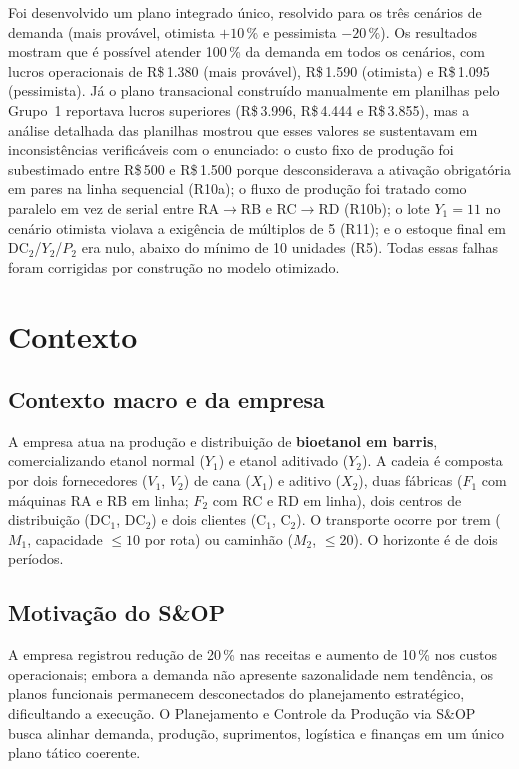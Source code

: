 \documentclass[11pt,a4paper]{article}
\newcommand{\rs}{R\$\,}
\begin{document}
Foi desenvolvido um plano integrado único, resolvido para os três cenários de demanda (mais provável, otimista $+10\,\%$ e pessimista $-20\,\%$). Os resultados mostram que é possível atender 100\,\% da demanda em todos os cenários, com lucros operacionais de \rs1.380 (mais provável), \rs1.590 (otimista) e \rs1.095 (pessimista). Já o plano transacional construído manualmente em planilhas pelo Grupo~1 reportava lucros superiores (\rs3.996, \rs4.444 e \rs3.855), mas a análise detalhada das planilhas mostrou que esses valores se sustentavam em inconsistências verificáveis com o enunciado: o custo fixo de produção foi subestimado entre \rs500 e \rs1.500 porque desconsiderava a ativação obrigatória em pares na linha sequencial (R10a); o fluxo de produção foi tratado como paralelo em vez de serial entre RA$\to$RB e RC$\to$RD (R10b); o lote $Y_1 = 11$ no cenário otimista violava a exigência de múltiplos de 5 (R11); e o estoque final em DC$_2$/$Y_2$/$P_2$ era nulo, abaixo do mínimo de 10 unidades (R5). Todas essas falhas foram corrigidas por construção no modelo otimizado.

\section{Contexto}

\subsection{Contexto macro e da empresa}
A empresa atua na produção e distribuição de \textbf{bioetanol em barris}, comercializando etanol normal ($Y_1$) e etanol aditivado ($Y_2$). A cadeia é composta por dois fornecedores ($V_1$, $V_2$) de cana ($X_1$) e aditivo ($X_2$), duas fábricas ($F_1$ com máquinas RA e RB em linha; $F_2$ com RC e RD em linha), dois centros de distribuição (DC$_1$, DC$_2$) e dois clientes (C$_1$, C$_2$). O transporte ocorre por trem ($M_1$, capacidade $\leq 10$ por rota) ou caminhão ($M_2$, $\leq 20$). O horizonte é de dois períodos.

\subsection{Motivação do S\&OP}
A empresa registrou redução de 20\,\% nas receitas e aumento de 10\,\% nos custos operacionais; embora a demanda não apresente sazonalidade nem tendência, os planos funcionais permanecem desconectados do planejamento estratégico, dificultando a execução. O Planejamento e Controle da Produção via S\&OP busca alinhar demanda, produção, suprimentos, logística e finanças em um único plano tático coerente.
\end{document}
